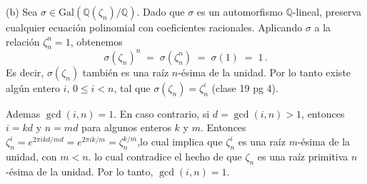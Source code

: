 \newcommand{\Gal}{\mathrm{Gal}}
\begin{solucion}
    \noindent (b) Sea $\sigma \in \Gal(\mathbb Q(\zeta_n)/\mathbb Q)$. Dado que $\sigma$ es un automorfismo $\mathbb Q$-lineal, preserva cualquier ecuación polinomial con coeficientes racionales. Aplicando $\sigma$ a la relación $\zeta_n^n = 1$, obtenemos 
    \[ \sigma(\zeta_n)^n \;=\; \sigma(\zeta_n^n) \;=\; \sigma(1) \;=\; 1\,.\] 
    Es decir, $\sigma(\zeta_n)$ también es una raíz $n$-ésima de la unidad. Por lo tanto existe algún entero $i$, $0\le i < n$, tal que $\sigma(\zeta_n) = \zeta_n^i$ (clase 19 pg 4). 

    Ademas $\gcd(i,n)=1$. En caso contrario, si $d=\gcd(i,n)>1$, entonces $i = kd$ y $n = md$ para algunos enteros $k$ y $m$. Entonces $\zeta_n^i = e^{2\pi i kd/md} = e^{2\pi i k/m} = \zeta_n^{k/m}$,lo cual implica que $\zeta_n^i$ es una raíz $m$-ésima de la unidad, con $m<n$. lo cual contradice el hecho de que $\zeta_n$ es una raíz primitiva $n$-ésima de la unidad. Por lo tanto, $\gcd(i,n)=1$.
\end{solucion}
